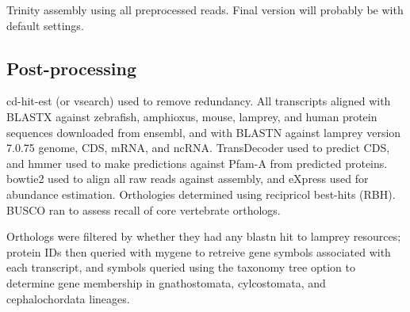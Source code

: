 \documentclass[10pt,twocolumn,linenumbers]{article}
\begin{document}
Trinity assembly using all preprocessed reads. Final version will probably be with default settings.

\subsection*{Post-processing}

cd-hit-est (or vsearch) used to remove redundancy.
All transcripts aligned with BLASTX against zebrafish, amphioxus, mouse, lamprey, and human protein sequences
downloaded from ensembl, and with BLASTN against lamprey version 7.0.75 genome, CDS, mRNA, and
ncRNA. TransDecoder used to predict CDS, and hmmer used to make predictions against Pfam-A from
predicted proteins. bowtie2 used to align all raw reads against assembly, and eXpress used for
abundance estimation. Orthologies determined using recipricol best-hits (RBH). BUSCO ran to assess
recall of core vertebrate orthologs.

Orthologs were filtered by whether they had any blastn hit to lamprey resources; protein IDs then
queried with mygene to retreive gene symbols associated with each transcript, and symbols queried
using the taxonomy tree option to determine gene membership in gnathostomata, cylcostomata, and
cephalochordata lineages.


{}      %


\end{document}

